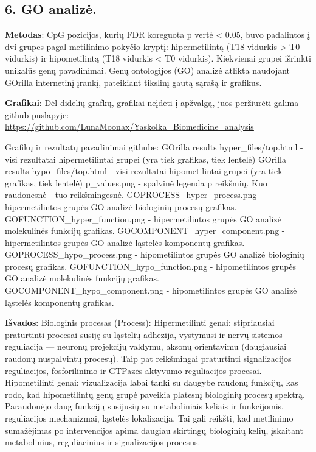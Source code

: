 \documentclass[
]{article}
\begin{document}
\subsection{6. GO analizė.}\label{go-analizux117.}

\textbf{Metodas}: CpG pozicijos, kurių FDR koreguota p vertė \textless{}
0.05, buvo padalintos į dvi grupes pagal metilinimo pokyčio kryptį:
hipermetilintą (T18 vidurkis \textgreater{} T0 vidurkis) ir
hipometilintą (T18 vidurkis \textless{} T0 vidurkis). Kiekvienai grupei
išrinkti unikalūs genų pavadinimai. Genų ontologijos (GO) analizė
atlikta naudojant GOrilla internetinį įrankį, pateikiant tikslinį gautą
sąrašą ir grafikus.

\textbf{Grafikai}: Dėl didelių grafkų, grafikai neįdėti į apžvalgą, juos
peržiūrėti galima github puslapyje:
\url{https://github.com/LunaMoonax/Yaskolka_Biomedicine_analysis}

Grafikų ir rezultatų pavadinimai githube: GOrilla results
hyper\_files/top.html - visi rezultatai hipermetilintai grupei (yra tiek
grafikas, tiek lentelė) GOrilla results hypo\_files/top.html - visi
rezultatai hipometilintai grupei (yra tiek grafikas, tiek lentelė)
p\_values.png - spalvinė legenda p reikšmių. Kuo raudonesnė - tuo
reikšmingesnė. GOPROCESS\_hyper\_process.png - hipermetilintos grupės GO
analizė biologinių procesų grafikas. GOFUNCTION\_hyper\_function.png -
hipermetilintos grupės GO analizė molekulinės funkcijų grafikas.
GOCOMPONENT\_hyper\_component.png - hipermetilintos grupės GO analizė
ląstelės komponentų grafikas. GOPROCESS\_hypo\_process.png -
hipometilintos grupės GO analizė biologinių procesų grafikas.
GOFUNCTION\_hypo\_function.png - hipometilintos grupės GO analizė
molekulinės funkcijų grafikas. GOCOMPONENT\_hypo\_component.png -
hipometilintos grupės GO analizė ląstelės komponentų grafikas.

\textbf{Išvados}: Biologinis procesas (Process): Hipermetilinti genai:
stipriausiai praturtinti procesai susiję su ląstelių adhezija, vystymusi
ir nervų sistemos reguliacija --- neuronų projekcijų valdymu, aksonų
orientavimu (daugiausiai raudonų nuspalvintų procesų). Taip pat
reikšmingai praturtinti signalizacijos reguliacijos, fosforilinimo ir
GTPazės aktyvumo reguliacijos procesai. Hipometilinti genai:
vizualizacija labai tanki su daugybe raudonų funkcijų, kas rodo, kad
hipometilintų genų grupė paveikia platesnį biologinių procesų spektrą.
Paraudonėjo daug funkcijų susijusių su metaboliniais keliais ir
funkcijomis, reguliacijos mechanizmai, ląstelės lokalizacija. Tai gali
reikšti, kad metilinimo sumažėjimas po intervencijos apima daugiau
skirtingų biologinių kelių, įskaitant metabolinius, reguliacinius ir
signalizacijos procesus.
\end{document}
